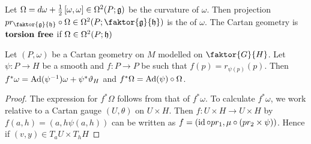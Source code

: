 \documentclass{article}
\begin{document}
\begin{definition}
	Let $\Omega = d\omega + \frac{1}{2} \left[ \omega, \omega \right]\in \Omega^2(P;\mathfrak{g})$ be the curvature of $\omega$. Then projection $pr_{\faktor{\mf{g}}{\mf{h}}}\circ \Omega \in \Omega^2(P;\faktor{\mf{g}}{\mf{h}})$ is the  of $\omega$. The Cartan geometry is $\textbf{torsion free}$ if $\Omega \in \Omega^2(P;\mathfrak{h})$
\end{definition}

\begin{lemma}
	Let $(P,\omega)$ be a Cartan geometry on $M$ modelled on $\faktor{G}{H}$. Let $\psi : P \to H$ be a smooth and $f : P \to  P $ be such that $f(p) = r_{\psi(p)}(p)$. Then $f^\ast \omega = \operatorname{Ad}(\psi^{-1})\omega + \psi^\ast \vartheta_H$ and $f^\ast \Omega = \operatorname{Ad}(\psi) \circ \Omega$.
\end{lemma}
\begin{proof}
	The expression for $f^\ast \Omega$ follows from that of $f^\ast \omega$. To calculate $f^\ast \omega$, we work relative to a Cartan gauge $(U,\theta)$ on $U \times H$. Then $f: U \times H \to U \times H$ by $f(a,h) = (a,h\psi(a,h))$ can be written as $f = (\operatorname{id} \circ pr_1, \mu \circ (pr_2 \times \psi))$. Hence if $(v,y) \in T_aU \times T_hH$
\end{proof}
\end{document}
